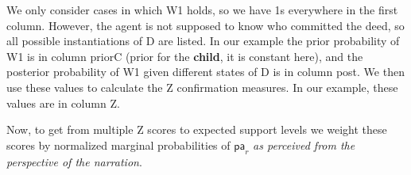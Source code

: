 \documentclass[10pt,]{scrartcl}
\newcommand{\s}[1]{\mbox{\textsf{#1}}}
\begin{document}
\begin{table}
\begin{table}[H]
\centering
{}
\end{table}
\caption{ECS calculation table for \s{W1} in the first scenario in the \s{Witness} problem.}
\label{t:w1}
\end{table}


 We only consider cases in which \textsf{W1} holds, so we have 1s everywhere in the first column. However, the agent is not supposed to know who committed the deed, so all possible instantiations of \textsf{D} are listed.   In our example the prior probability of \s{W1} is in column \textsf{priorC} (prior for the \textbf{child}, it is constant here), and the posterior probability of \textsf{W1} given different states of \textsf{D} is in column \s{post}.  We then  use these values to calculate the \s{Z} confirmation measures. In our example, these values are in column \s{Z}. 
 
 
 Now, to get from multiple \s{Z} scores to expected support levels we weight these scores by normalized  marginal probabilities of \(\mathsf{pa}_r\) \emph{as perceived from the perspective of the narration}. 
 
\end{document}
